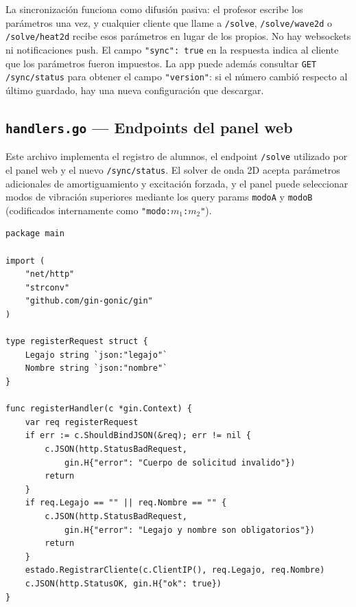 \documentclass[12pt, a4paper]{article}
\begin{document}
La sincronización funciona como difusión pasiva: el profesor escribe los parámetros
una vez, y cualquier cliente que llame a \texttt{/solve}, \texttt{/solve/wave2d} o
\texttt{/solve/heat2d} recibe esos parámetros en lugar de los propios. No hay
websockets ni notificaciones push. El campo \texttt{"sync": true} en la respuesta
indica al cliente que los parámetros fueron impuestos. La app puede además consultar
\texttt{GET /sync/status} para obtener el campo \texttt{"version"}: si el número
cambió respecto al último guardado, hay una nueva configuración que descargar.

\subsection{\texttt{handlers.go} — Endpoints del panel web}

Este archivo implementa el registro de alumnos, el endpoint \texttt{/solve} utilizado
por el panel web y el nuevo \texttt{/sync/status}. El solver de onda 2D acepta
parámetros adicionales de amortiguamiento y excitación forzada, y el panel puede
seleccionar modos de vibración superiores mediante los query params \texttt{modoA} y
\texttt{modoB} (codificados internamente como \texttt{"modo:$m_1$:$m_2$"}).

\begin{lstlisting}[style=golang, caption={\texttt{handlers.go} — registro de alumno}]
package main

import (
    "net/http"
    "strconv"
    "github.com/gin-gonic/gin"
)

type registerRequest struct {
    Legajo string `json:"legajo"`
    Nombre string `json:"nombre"`
}

func registerHandler(c *gin.Context) {
    var req registerRequest
    if err := c.ShouldBindJSON(&req); err != nil {
        c.JSON(http.StatusBadRequest,
            gin.H{"error": "Cuerpo de solicitud invalido"})
        return
    }
    if req.Legajo == "" || req.Nombre == "" {
        c.JSON(http.StatusBadRequest,
            gin.H{"error": "Legajo y nombre son obligatorios"})
        return
    }
    estado.RegistrarCliente(c.ClientIP(), req.Legajo, req.Nombre)
    c.JSON(http.StatusOK, gin.H{"ok": true})
}
\end{lstlisting}
\end{document}
